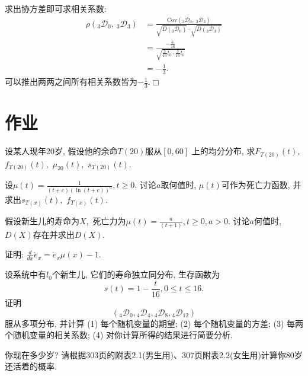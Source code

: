 \documentclass[a4paper,10pt]{ctexbook}
\def\qed{\hfill$\Box$\medskip}
\begin{document}
求出协方差即可求相关系数:
\begin{align*}
    \rho(_{3}\mathscr D _{0},\ _{3}\mathscr D _{3}) & =\frac{\text{Cov}(_{3}\mathscr D_{0},\ _{3}\mathscr D _{3})}{\sqrt{D(_{3}\mathscr D _{0})}\cdot \sqrt{D(_{3}\mathscr D _{3})}} \\
                                                    & =\frac{-\frac{l_{0}}{16}}{\sqrt{\frac{3}{16}l_{0}\cdot \frac{3}{16}l_{0}}}                                                     \\
                                                    & =-\frac{1}{3}.
\end{align*}
可以推出两两之间所有相关系数皆为$-\frac{1}{3}$.\qed

\section{作业}
\begin{exs}
    设某人现年20岁, 假设他的余命$T(20)$服从$[0,60]$ 上的均分分布, 求$F_{T(20)}(t),$ $ f_{T(20)}(t),$ $\mu_{20}(t),$ $s_{T(20)}(t).$
\end{exs}

\begin{exs}
    设$\mu(t)=\frac{1}{(t+e)(\ln (t+e))^a},t\ge0.$ 讨论$a$取何值时, $\mu(t)$可作为死亡力函数, 并求出$s_{T(x)}(t),$ $f_{T(x)}(t).$
\end{exs}

\begin{exs}
    假设新生儿的寿命为$X,$ 死亡力为$\mu(t)=\frac{a}{(t+1)},t\ge0, a>0.$ 讨论$a$何值时, $D(X)$存在并求出$D(X).$
\end{exs}

\begin{exs}
    证明: $\frac{d}{dx}\mathring e_x=\mathring e_x\mu(x)-1.$
\end{exs}

\begin{exs}设系统中有$l_0$个新生儿, 它们的寿命独立同分布, 生存函数为
    $$s(t)=1-\frac{t}{16}, 0\le t\le 16.$$ 证明$$({}_4\mathscr D_0, {}_4\mathscr D_4,{}_{4}\mathscr D_8, {}_{4}\mathscr D_{12})$$服从多项分布, 并计算 (1) 每个随机变量的期望; (2) 每个随机变量的方差; (3) 每两个随机变量的相关系数; (4) 对你计算所得的结果进行简要分析.
\end{exs}

\begin{exs}
    你现在多少岁? 请根据303页的附表2.1(男生用)、307页附表2.2(女生用)计算你80岁还活着的概率.
\end{exs}
\end{document}
